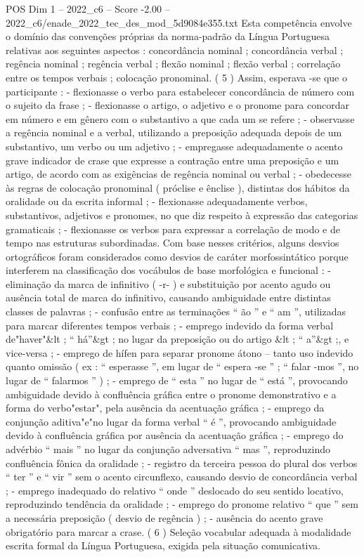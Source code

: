 \begin{textsample}{POS Dim 1 – 2022\_c6 – Score -2.00 – 2022\_c6/enade\_2022\_tec\_des\_mod\_5d9084e355.txt}
Esta competência envolve o domínio das convenções próprias da norma-padrão da Língua Portuguesa relativas aos seguintes aspectos : concordância nominal ; concordância verbal ; regência nominal ; regência verbal ; flexão nominal ; flexão verbal ; correlação entre os tempos verbais ; colocação pronominal. ( 5 ) Assim, esperava -se que o participante : - flexionasse o verbo para estabelecer concordância de número com o sujeito da frase ; - flexionasse o artigo, o adjetivo e o pronome para concordar em número e em gênero com o substantivo a que cada um se refere ; - observasse a regência nominal e a verbal, utilizando a preposição adequada depois de um substantivo, um verbo ou um adjetivo ; - empregasse adequadamente o acento grave indicador de crase que expresse a contração entre uma preposição e um artigo, de acordo com as exigências de regência nominal ou verbal ; - obedecesse às regras de colocação pronominal ( próclise e ênclise ), distintas dos hábitos da oralidade ou da escrita informal ; - flexionasse adequadamente verbos, substantivos, adjetivos e pronomes, no que diz respeito à expressão das categorias gramaticais ; - flexionasse os verbos para expressar a correlação de modo e de tempo nas estruturas subordinadas.
Com base nesses critérios, alguns desvios ortográficos foram considerados como desvios de caráter morfossintático porque interferem na classificação dos vocábulos de base morfológica e funcional : - eliminação da marca de infinitivo ( -r- ) e substituição por acento agudo ou ausência total de marca do infinitivo, causando ambiguidade entre distintas classes de palavras ; - confusão entre as terminações “ ão ” e “ am ”, utilizadas para marcar diferentes tempos verbais ; - emprego indevido da forma verbal de"haver"\&lt ; “ há”\&gt ; no lugar da preposição ou do artigo \&lt ; “ a”\&gt ;, e vice-versa ; - emprego de hífen para separar pronome átono – tanto uso indevido quanto omissão ( ex : “ esperasse ”, em lugar de “ espera -se ” ; “ falar -mos ”, no lugar de “ falarmos ” ) ; - emprego de “ esta ” no lugar de “ está ”, provocando ambiguidade devido à confluência gráfica entre o pronome demonstrativo e a forma do verbo"estar", pela ausência da acentuação gráfica ; - emprego da conjunção aditiva"e"no lugar da forma verbal “ é ”, provocando ambiguidade devido à confluência gráfica por ausência da acentuação gráfica ; - emprego do advérbio “ mais ” no lugar da conjunção adversativa “ mas ”, reproduzindo confluência fônica da oralidade ; - registro da terceira pessoa do plural dos verbos “ ter ” e “ vir ” sem o acento circunflexo, causando desvio de concordância verbal ; - emprego inadequado do relativo “ onde ” deslocado do seu sentido locativo, reproduzindo tendência da oralidade ; - emprego do pronome relativo “ que ” sem a necessária preposição ( desvio de regência ) ; - ausência do acento grave obrigatório para marcar a crase. ( 6 ) Seleção vocabular adequada à modalidade escrita formal da Língua Portuguesa, exigida pela situação comunicativa.

\end{textsample}
